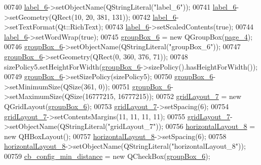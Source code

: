 \begin{DoxyCode}
00740         \hyperlink{a00027_a663f728e6244926a795c6e6892673b1d}{label\_6}->setObjectName(QStringLiteral(\textcolor{stringliteral}{"label\_6"}));
00741         \hyperlink{a00027_a663f728e6244926a795c6e6892673b1d}{label\_6}->setGeometry(QRect(10, 20, 381, 131));
00742         \hyperlink{a00027_a663f728e6244926a795c6e6892673b1d}{label\_6}->setTextFormat(Qt::RichText);
00743         \hyperlink{a00027_a663f728e6244926a795c6e6892673b1d}{label\_6}->setScaledContents(\textcolor{keyword}{true});
00744         \hyperlink{a00027_a663f728e6244926a795c6e6892673b1d}{label\_6}->setWordWrap(\textcolor{keyword}{true});
00745         \hyperlink{a00027_a40a9931365fd3679efec4f0112073db2}{groupBox\_6} = \textcolor{keyword}{new} QGroupBox(\hyperlink{a00027_ad52b1b3da7f1a695b9d3b521254c961d}{page\_4});
00746         \hyperlink{a00027_a40a9931365fd3679efec4f0112073db2}{groupBox\_6}->setObjectName(QStringLiteral(\textcolor{stringliteral}{"groupBox\_6"}));
00747         \hyperlink{a00027_a40a9931365fd3679efec4f0112073db2}{groupBox\_6}->setGeometry(QRect(0, 360, 376, 71));
00748         sizePolicy5.setHeightForWidth(\hyperlink{a00027_a40a9931365fd3679efec4f0112073db2}{groupBox\_6}->sizePolicy().hasHeightForWidth());
00749         \hyperlink{a00027_a40a9931365fd3679efec4f0112073db2}{groupBox\_6}->setSizePolicy(sizePolicy5);
00750         \hyperlink{a00027_a40a9931365fd3679efec4f0112073db2}{groupBox\_6}->setMinimumSize(QSize(361, 0));
00751         \hyperlink{a00027_a40a9931365fd3679efec4f0112073db2}{groupBox\_6}->setMaximumSize(QSize(16777215, 16777215));
00752         \hyperlink{a00027_a4c2d544352d423a361b8ab2e1d5636ec}{gridLayout\_7} = \textcolor{keyword}{new} QGridLayout(\hyperlink{a00027_a40a9931365fd3679efec4f0112073db2}{groupBox\_6});
00753         \hyperlink{a00027_a4c2d544352d423a361b8ab2e1d5636ec}{gridLayout\_7}->setSpacing(6);
00754         \hyperlink{a00027_a4c2d544352d423a361b8ab2e1d5636ec}{gridLayout\_7}->setContentsMargins(11, 11, 11, 11);
00755         \hyperlink{a00027_a4c2d544352d423a361b8ab2e1d5636ec}{gridLayout\_7}->setObjectName(QStringLiteral(\textcolor{stringliteral}{"gridLayout\_7"}));
00756         \hyperlink{a00027_a8ead8fc876ee91c30864822eedb9c370}{horizontalLayout\_8} = \textcolor{keyword}{new} QHBoxLayout();
00757         \hyperlink{a00027_a8ead8fc876ee91c30864822eedb9c370}{horizontalLayout\_8}->setSpacing(6);
00758         \hyperlink{a00027_a8ead8fc876ee91c30864822eedb9c370}{horizontalLayout\_8}->setObjectName(QStringLiteral(\textcolor{stringliteral}{"horizontalLayout\_8"}));
00759         \hyperlink{a00027_a6b0d09f3b380fdb810d3da3f5208ccf5}{cb\_config\_min\_distance} = \textcolor{keyword}{new} QCheckBox(\hyperlink{a00027_a40a9931365fd3679efec4f0112073db2}{groupBox\_6});

\end{DoxyCode}
